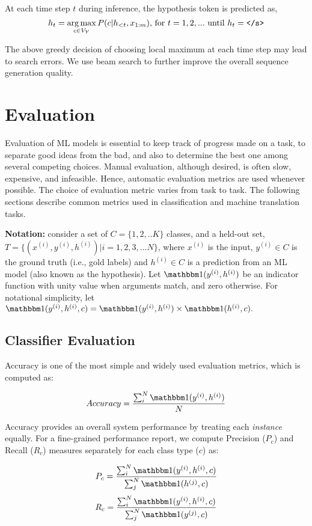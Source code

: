 At each time step $t$ during inference, the hypothesis token is predicted as, 
$$ h_t = \operatorname*{arg\,max}_{c \in V_Y} P(c | h_{<t}, x_{1:m}) \text{, for } t=1, 2,  ... \text{ until } h_t = \mbox{\texttt{</s>}}$$

The above greedy decision of choosing local maximum at each time step may lead to search errors.
We use beam search to further improve the overall sequence generation quality.

\section{Evaluation}
\label{ch:background-sec:eval}

Evaluation of ML models is essential to keep track of progress made on a task, to separate good ideas from the bad, and also to determine the best one among several competing choices. 
Manual evaluation, although desired, is often slow, expensive, and infeasible.
Hence, automatic evaluation metrics are used whenever possible. 
The choice of evaluation metric varies from task to task. 
The following sections describe common metrics used in classification and machine translation tasks. 

\textbf{Notation:} consider a set of $C = \{ 1, 2, .. K \}$ classes, and a held-out set, $T = \{ (x^{(i)}, y^{(i)}, h^{(i)}) | i = 1, 2, 3, ... N \}$, where $x^{(i)}$ is the input, $y^{(i)} \in C$ is the ground truth (i.e., gold labels) and $h^{(i)} \in C$ is a prediction from an ML model (also known as the hypothesis). 
Let $\ind{y^{(i)}, h^{(i)}}$ be an indicator function with unity value when arguments match, and zero otherwise.
For notational simplicity, let $\ind{y^{(i)}, h^{(i)}, c} = \ind{y^{(i)}, h^{(i)}} \times \ind{h^{(i)}, c}.$


\subsection{Classifier Evaluation}
\label{ch:background-sec:cls-eval}
Accuracy is one of the most simple and widely used evaluation metrics, which is computed as:

$$Accuracy = \frac{\sum_i^N \ind{y^{(i)}, h^{(i)}}}{N}$$

Accuracy provides an overall system performance by treating each \textit{instance} equally. For a fine-grained performance report, we compute Precision ($P_c$) and Recall ($R_c$) measures separately for each class type ($c$) as: 

$$P_c = \frac{\sum_i^N \ind{y^{(i)}, h^{(i)}, c}} {\sum_j^N \ind{h^{(j)}, c}}$$
$$R_c = \frac{\sum_i^N \ind{y^{(i)}, h^{(i)}, c}} {\sum_j^N \ind{y^{(j)}, c}}$$

